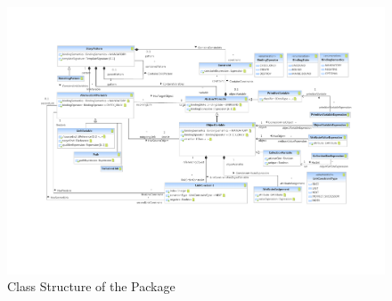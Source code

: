 %
%

\begin{figure}[htbp]
  \centering
  \includegraphics[width=\textheight,angle=90]{figures/A_technical-reference/packages/storydiagrams_patterns/storydiagrams-patterns}
  \caption{Class Structure of the  Package}
  \label{fig:MM:patterns}
\end{figure}
